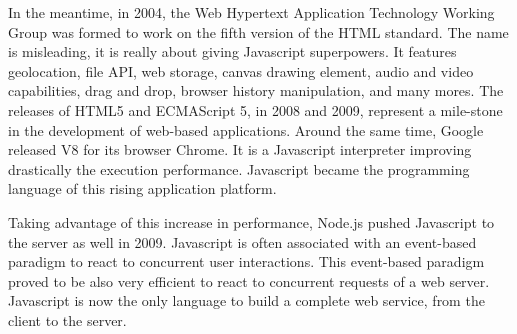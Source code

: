 In the meantime, in 2004, the Web Hypertext Application Technology Working Group was formed to work on the fifth version of the HTML standard.
The name is misleading, it is really about giving Javascript superpowers.
It features geolocation, file API, web storage, canvas drawing element, audio and video capabilities, drag and drop, browser history manipulation, and many mores.
The releases of HTML5 and ECMAScript 5, in 2008 and 2009, represent a mile-stone in the development of web-based applications.
Around the same time, Google released V8 for its browser Chrome.
It is a Javascript interpreter improving drastically the execution performance. %
Javascript became the programming language of this rising application platform.

Taking advantage of this increase in performance, Node.js pushed Javascript to the server as well in 2009.
Javascript is often associated with an event-based paradigm to react to concurrent user interactions.
This event-based paradigm proved to be also very efficient to react to concurrent requests of a web server.
Javascript is now the only language to build a complete web service, from the client to the server.





